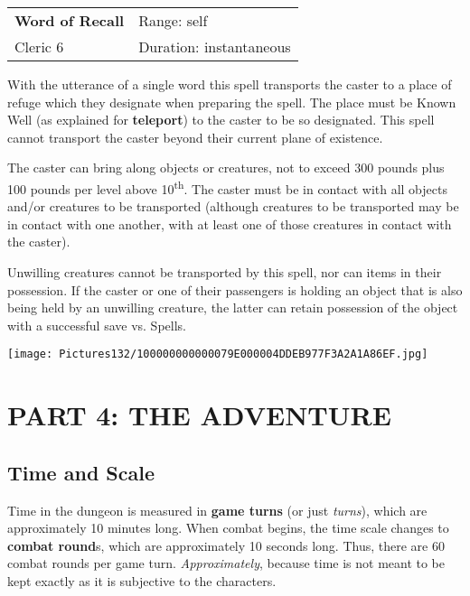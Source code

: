 \documentclass[a4paper,twoside,openany,10pt]{book}
\begin{document}
\begin{multicols}{2}
\smallskip\begin{flushleft} 
	\begin{tabularx}{0.45\textwidth}{@{}m{3.5cm}m{5.5cm}@{}} 
		\textbf{Word of Recall} & Range: self\\
Cleric 6 &Duration: instantaneous\\
	\end{tabularx}\end{flushleft}

With the utterance of a single word this spell transports the caster to a place of refuge which they designate when preparing the spell. The place must be Known Well (as explained for \textbf{teleport}) to the caster to be so designated. This spell cannot transport the caster beyond their current plane of existence.

The caster can bring along objects or creatures, not to exceed 300 pounds plus 100 pounds per level above 10\textsuperscript{th}. The caster must be in contact with all objects and/or creatures to be transported (although creatures to be transported may be in contact with one another, with at least one of those creatures in contact with the caster).

Unwilling creatures cannot be transported by this spell, nor can items in their possession. If the caster or one of their passengers is holding an object that is also being held by an unwilling creature, the latter can retain possession of the object with a successful save vs. Spells. 

\end{multicols}

\vfill

\begin{center}
	\texttt{[image: Pictures132/100000000000079E000004DDEB977F3A2A1A86EF.jpg]}
\end{center}

\pagebreak

\section{PART 4: THE ADVENTURE}\label{part-4-the-adventure}

\subsection{Time and Scale}\label{time-and-scale}

Time in the dungeon is measured in \textbf{game turns} (or just \emph{turns}), which are approximately 10 minutes long. When combat begins, the time scale changes to \textbf{combat round}s, which are approximately 10 seconds long. Thus, there are 60 combat rounds per game turn. \emph{Approximately}, because time is not meant to be kept exactly as it is subjective to the characters.
\end{document}
